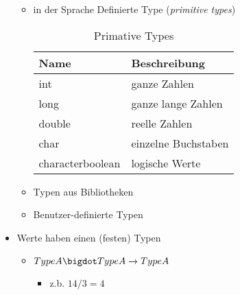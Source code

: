 \documentclass[11pt]{article}
\begin{document}
\begin{itemize}
\begin{itemize}
\item in der Sprache Definierte Type (\emph{primitive types})\\
\begin{table}[htbp]
\caption{Primative Types}
\centering
\begin{tabular}{ll}
Name & Beschreibung\\
\hline
int & ganze Zahlen\\
long & ganze lange Zahlen\\
double & reelle Zahlen\\
char & einzelne Buchstaben\\
characterboolean & logische Werte\\
\end{tabular}
\end{table}
\item Typen aus Bibliotheken\\
\item Benutzer-definierte Typen\\
\end{itemize}

\item Werte haben einen (festen) Typen\\
\begin{itemize}
\item \(TypeA \bigdot TypeA \rightarrow TypeA\)\\
\begin{itemize}
\item z.b. \(14 / 3 = 4\)\\
\end{itemize}
\end{itemize}
\end{itemize}
\end{document}
